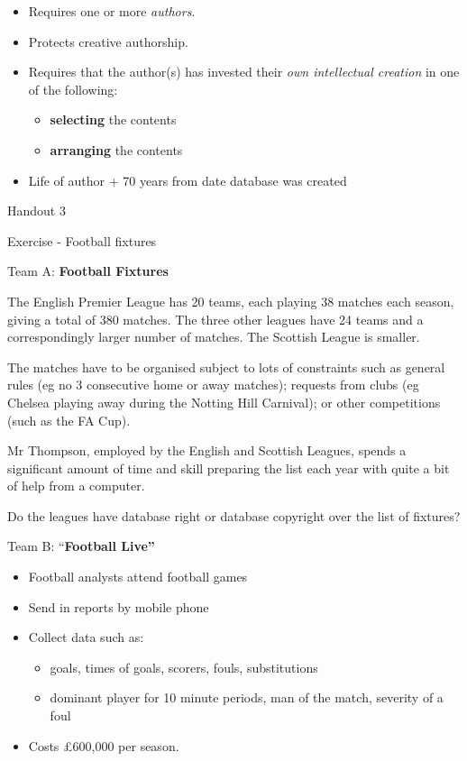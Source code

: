 \documentclass{article}
\begin{document}
\begin{itemize}
\item
  Requires one or more \emph{authors}.
\item
  Protects creative authorship.
\item
  Requires that the author(s) has invested their \emph{own intellectual
  creation} in one of the following:

  \begin{itemize}
  \item
    \textbf{selecting} the contents
  \item
    \textbf{arranging} the contents
  \end{itemize}
\item
  Life of author + 70 years from date database was created
\end{itemize}

Handout 3

Exercise - Football fixtures

Team A: \textbf{Football Fixtures}

The English Premier League has 20 teams, each playing 38 matches each
season, giving a total of 380 matches. The three other leagues have 24
teams and a correspondingly larger number of matches. The Scottish
League is smaller.

The matches have to be organised subject to lots of constraints such as
general rules (eg no 3 consecutive home or away matches); requests from
clubs (eg Chelsea playing away during the Notting Hill Carnival); or
other competitions (such as the FA Cup).

Mr Thompson, employed by the English and Scottish Leagues, spends a
significant amount of time and skill preparing the list each year with
quite a bit of help from a computer.

Do the leagues have database right or database copyright over the list
of fixtures?

Team B: ``\textbf{Football Live''}

\begin{itemize}
\item
  Football analysts attend football games
\item
  Send in reports by mobile phone
\item
  Collect data such as:

  \begin{itemize}
  \item
    goals, times of goals, scorers, fouls, substitutions
  \item
    dominant player for 10 minute periods, man of the match, severity of
    a foul
  \end{itemize}
\item
  Costs £600,000 per season.
\end{itemize}
\end{document}
